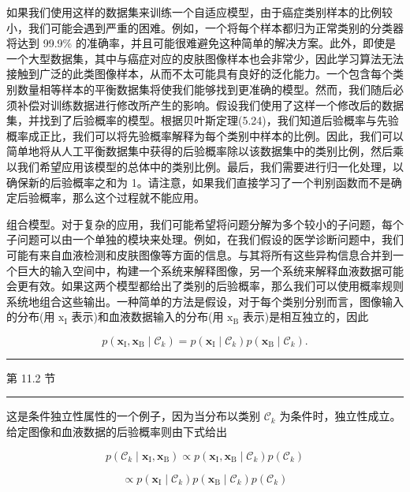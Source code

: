 \documentclass[10pt]{article}
\newcommand{\HRule}{\begin{center}\rule{0.9\linewidth}{0.2mm}\end{center}}
\begin{document}
如果我们使用这样的数据集来训练一个自适应模型，由于癌症类别样本的比例较小，我们可能会遇到严重的困难。例如，一个将每个样本都归为正常类别的分类器将达到 99.9\% 的准确率，并且可能很难避免这种简单的解决方案。此外，即使是一个大型数据集，其中与癌症对应的皮肤图像样本也会非常少，因此学习算法无法接触到广泛的此类图像样本，从而不太可能具有良好的泛化能力。一个包含每个类别数量相等样本的平衡数据集将使我们能够找到更准确的模型。然而，我们随后必须补偿对训练数据进行修改所产生的影响。假设我们使用了这样一个修改后的数据集，并找到了后验概率的模型。根据贝叶斯定理(5.24)，我们知道后验概率与先验概率成正比，我们可以将先验概率解释为每个类别中样本的比例。因此，我们可以简单地将从人工平衡数据集中获得的后验概率除以该数据集中的类别比例，然后乘以我们希望应用该模型的总体中的类别比例。最后，我们需要进行归一化处理，以确保新的后验概率之和为 1。请注意，如果我们直接学习了一个判别函数而不是确定后验概率，那么这个过程就不能应用。

组合模型。对于复杂的应用，我们可能希望将问题分解为多个较小的子问题，每个子问题可以由一个单独的模块来处理。例如，在我们假设的医学诊断问题中，我们可能有来自血液检测和皮肤图像等方面的信息。与其将所有这些异构信息合并到一个巨大的输入空间中，构建一个系统来解释图像，另一个系统来解释血液数据可能会更有效。如果这两个模型都给出了类别的后验概率，那么我们可以使用概率规则系统地组合这些输出。一种简单的方法是假设，对于每个类别分别而言，图像输入的分布(用 \({\mathrm{x}}_{\mathrm{I}}\) 表示)和血液数据输入的分布(用 \({\mathrm{x}}_{\mathrm{B}}\) 表示)是相互独立的，因此

\[
p\left( {{\mathbf{x}}_{\mathrm{I}},{\mathbf{x}}_{\mathrm{B}} \mid  {\mathcal{C}}_{k}}\right)  = p\left( {{\mathbf{x}}_{\mathrm{I}} \mid  {\mathcal{C}}_{k}}\right) p\left( {{\mathbf{x}}_{\mathrm{B}} \mid  {\mathcal{C}}_{k}}\right) . \tag{5.26}
\]

\HRule

第 11.2 节

\HRule

这是条件独立性属性的一个例子，因为当分布以类别 \({\mathcal{C}}_{k}\) 为条件时，独立性成立。给定图像和血液数据的后验概率则由下式给出

\[
p\left( {{\mathcal{C}}_{k} \mid  {\mathbf{x}}_{\mathrm{I}},{\mathbf{x}}_{\mathrm{B}}}\right)  \propto  p\left( {{\mathbf{x}}_{\mathrm{I}},{\mathbf{x}}_{\mathrm{B}} \mid  {\mathcal{C}}_{k}}\right) p\left( {\mathcal{C}}_{k}\right)
\]

\[
\propto  p\left( {{\mathbf{x}}_{\mathrm{I}} \mid  {\mathcal{C}}_{k}}\right) p\left( {{\mathbf{x}}_{\mathrm{B}} \mid  {\mathcal{C}}_{k}}\right) p\left( {\mathcal{C}}_{k}\right)
\]
\end{document}
